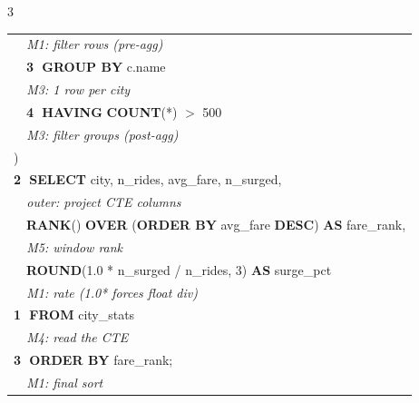 \documentclass[landscape,letterpaper,9pt]{extarticle}
\begin{document}
\begin{multicols*}{3}
{\begin{minipage}{\dimexpr\linewidth-2pt}
{\begin{tabular}{@{}l@{}}
\textcolor{cmt}{\itshape ~~M1: filter rows (pre-agg)} \\
\textcolor{stepGroup}{~~\textbf{\textcircled{\scriptsize 3} GROUP BY} c.name} \\
\textcolor{cmt}{\itshape ~~M3: 1 row per city} \\
\textcolor{stepHaving}{~~\textbf{\textcircled{\scriptsize 4} HAVING} \textbf{COUNT}(*) $>$ 500} \\
\textcolor{cmt}{\itshape ~~M3: filter groups (post-agg)} \\
) \\
\textcolor{stepWhere}{\textbf{\textcircled{\scriptsize 2} SELECT} city, n\_rides, avg\_fare, n\_surged,} \\
\textcolor{cmt}{\itshape ~~outer: project CTE columns} \\
\textcolor{stepWhere}{~~\textbf{RANK}() \textbf{OVER} (\textbf{ORDER BY} avg\_fare \textbf{DESC}) \textbf{AS} fare\_rank,} \\
\textcolor{cmt}{\itshape ~~M5: window rank} \\
\textcolor{stepWhere}{~~\textbf{ROUND}(1.0 * n\_surged / n\_rides, 3) \textbf{AS} surge\_pct} \\
\textcolor{cmt}{\itshape ~~M1: rate (1.0* forces float div)} \\
\textcolor{stepFrom}{\textbf{\textcircled{\scriptsize 1} FROM} city\_stats} \\
\textcolor{cmt}{\itshape ~~M4: read the CTE} \\
\textcolor{stepGroup}{\textbf{\textcircled{\scriptsize 3} ORDER BY} fare\_rank;} \\
\textcolor{cmt}{\itshape ~~M1: final sort} \\
\end{tabular}}
\end{minipage}}

\end{multicols*}
\end{document}
